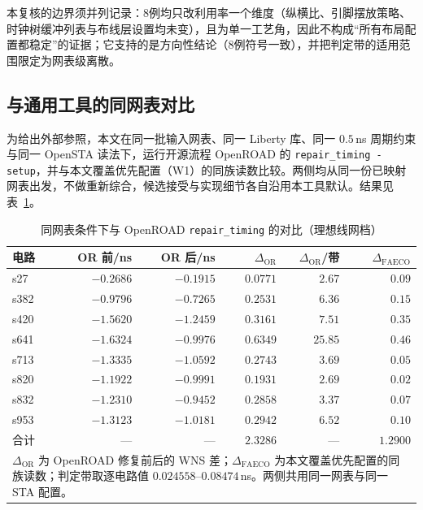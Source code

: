 \documentclass[twocolumn,10pt,fontset=windows]{ctexart}
\begin{document}
本复核的边界须并列记录：8例均只改利用率一个维度（纵横比、引脚摆放策略、时钟树缓冲列表与布线层设置均未变），且为单一工艺角，因此不构成“所有布局配置都稳定”的证据；它支持的是方向性结论（8例符号一致），并把判定带的适用范围限定为网表级离散。

\subsection{与通用工具的同网表对比}\label{sec:or_baseline}

为给出外部参照，本文在同一批输入网表、同一 Liberty 库、同一 $0.5$\,ns 周期约束与同一 OpenSTA 读法下，运行开源流程 OpenROAD 的 \texttt{repair\_timing -setup}，并与本文覆盖优先配置（W1）的同族读数比较。两侧均从同一份已映射网表出发，不做重新综合，候选接受与实现细节各自沿用本工具默认。结果见表~\ref{tab:or_baseline}。

\begin{table}[H]
\centering
\caption{同网表条件下与 OpenROAD \texttt{repair\_timing} 的对比（理想线网档）}
\label{tab:or_baseline}
\footnotesize
\setlength{\tabcolsep}{5pt}
\begin{tabular}{lrrrrr}
\toprule
\textbf{电路} & \textbf{OR 前/ns} & \textbf{OR 后/ns} & \textbf{$\Delta_{\mathrm{OR}}$} & \textbf{$\Delta_{\mathrm{OR}}$/带} & \textbf{$\Delta_{\mathrm{FAECO}}$} \\
\midrule
s27  & $-0.2686$ & $-0.1915$ & $0.0771$ & $2.67$  & $0.09$ \\
s382 & $-0.9796$ & $-0.7265$ & $0.2531$ & $6.36$  & $0.15$ \\
s420 & $-1.5620$ & $-1.2459$ & $0.3161$ & $7.51$  & $0.35$ \\
s641 & $-1.6324$ & $-0.9976$ & $0.6349$ & $25.85$ & $0.46$ \\
s713 & $-1.3335$ & $-1.0592$ & $0.2743$ & $3.69$  & $0.05$ \\
s820 & $-1.1922$ & $-0.9991$ & $0.1931$ & $2.69$  & $0.02$ \\
s832 & $-1.2310$ & $-0.9452$ & $0.2858$ & $3.37$  & $0.07$ \\
s953 & $-1.3123$ & $-1.0181$ & $0.2942$ & $6.52$  & $0.10$ \\
\midrule
合计 & — & — & $2.3286$ & — & $1.2900$ \\
\bottomrule
\multicolumn{6}{p{0.95\columnwidth}}{\footnotesize $\Delta_{\mathrm{OR}}$ 为 OpenROAD 修复前后的 WNS 差；$\Delta_{\mathrm{FAECO}}$ 为本文覆盖优先配置的同族读数；判定带取逐电路值 $0.024558$--$0.08474$\,ns。两侧共用同一网表与同一 STA 配置。}\\
\end{tabular}
\end{table}
\end{document}
